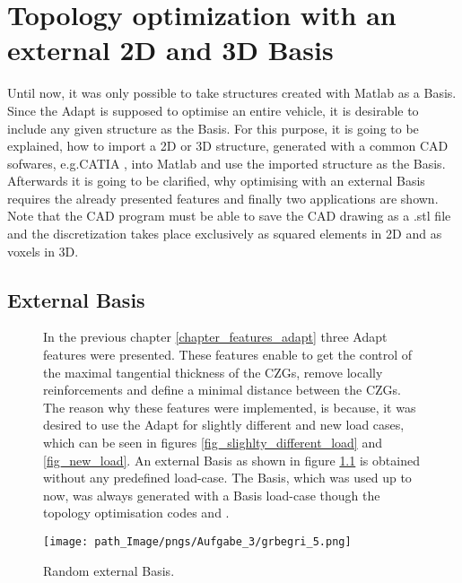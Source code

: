 
\chapter{Topology optimization with an external 2D and 3D Basis}
\label{chapter_external_basis}

Until now, it was only possible to
 take structures created with
  Matlab as a Basis. Since the Adapt is
  supposed to optimise an entire vehicle, it 
  is desirable
   to include  any given  structure as
   the Basis. For this purpose, it is going to be explained, how to
    import a 2D or 3D structure, generated with a common
     CAD sofwares, e.g.CATIA , into Matlab and use the imported
     structure as the Basis. Afterwards it is going to be clarified,
     why optimising with an external Basis requires
     the already presented features and finally 
     two applications are shown.
     Note that the CAD program must be able to save the CAD drawing as
      a .stl file and the discretization takes place exclusively as
      squared elements in 2D and as voxels in 3D. 
      
      \section{External Basis}
      \begin{figure}[H]
      \begin{minipage}{0.45\textwidth}
            In the previous chapter \ref{chapter_features_adapt} three Adapt
      features were presented. These features enable to get the control
      of the maximal tangential thickness of the CZGs, remove
      locally reinforcements and define a minimal distance between
      the CZGs. The reason why these features were implemented,
      is because, it was desired to use the Adapt for slightly different and 
      new load cases, which can be seen in figures
      \ref{fig_slighlty_different_load} and
      \ref{fig_new_load}. An external Basis as shown in figure
      \ref{fig_ext_bas_1} is obtained without any predefined load-case.
      The Basis, which was used up to now, was always
      generated with a Basis load-case though the topology
      optimisation codes \cite{Andreassen.2011} and \cite{Liu.2014}.
          \end{minipage}
      \hfill
            \begin{minipage}{0.45\textwidth}
      	\centering
  \texttt{[image: path\_Image/pngs/Aufgabe\_3/grbegri\_5.png]}
	\caption{Random external Basis.} 
	\label{fig_ext_bas_1}
      \end{minipage}
      \end{figure}
      

